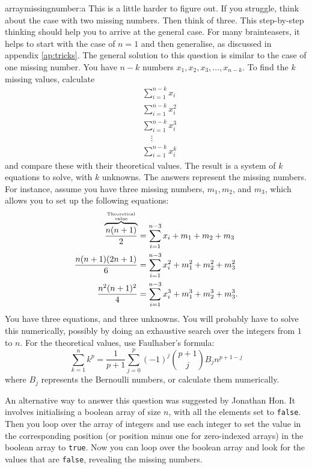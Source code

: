 \begin{subanswer}{arraymissingnumber:a}
This is a little harder to figure out.
If you struggle, think about the case with two missing numbers.
Then think of three.
This step-by-step thinking should help you to arrive at the general case.
For many brainteasers, it helps to start with the case of $n=1$ and then generalise, as discussed in appendix \ref{ap:tricks}.
The general solution to this question is similar to the case of one missing number.
You have $n-k$ numbers $x_1, x_2, x_3, \ldots , x_{n-k}$.
To find the $k$ missing values, calculate
\begin{align*}
& \sum_{i=1}^{n-k}{ x_i   } \\
& \sum_{i=1}^{n-k}{ x_i^2 } \\
& \sum_{i=1}^{n-k}{ x_i^3 } \\
& \quad\vdots \\
& \sum_{i=1}^{n-k}{ x_i^k }
\end{align*}
and compare these with their theoretical values.
The result is a system of $k$ equations to solve, with $k$ unknowns.
The answers represent the missing numbers.
For instance, assume you have three missing numbers, $m_1, m_2$, and $m_3$, which allows you to set up the following equations:
\begin{align*}
 \overbrace{\frac{n(n+1)}{2}}^{ \text{Theoretical} \atop \text{value} }
 &=
 \sum_{i=1}^{n-3}{ x_i }
+  m_1 + m_2 + m_3
\\
 \frac{n(n+1)(2n + 1)}{6}
 &=
 \sum_{i=1}^{n-3}{ x_i^2 }
+ m_1^2 + m_2^2 + m_3^2
\\
 \frac{n^2(n+1)^2}{4}
 &=
 \sum_{i=1}^{n-3}{ x_i^3 }
+ m_1^3 + m_2^3 + m_3^3
\text{.}
\end{align*}
You have three equations, and three unknowns.
You will probably have to solve this numerically, possibly by doing an exhaustive search over the integers from $1$ to $n$.
For the theoretical values, use Faulhaber's formula:
\[
  \sum_{k=1}^{n}{k^p} = \frac{1}{p+1} \sum_{j=0}^{p}{ (-1)^j \binom{p+1}{j} B_j n^{p+1-j} }
\]
where $B_j$ represents the Bernoulli numbers, or calculate them numerically.

An alternative way to answer this question was suggested by Jonathan Hon.
It involves initialising a boolean array of size $n$, with all the elements set to \verb+false+.
Then you loop over the array of integers and use each integer to set the value in the corresponding position (or position minus one for zero-indexed arrays) in the boolean array to \verb+true+.
Now you can loop over the boolean array and look for the values that are \verb+false+, revealing the missing numbers.


\end{subanswer}
